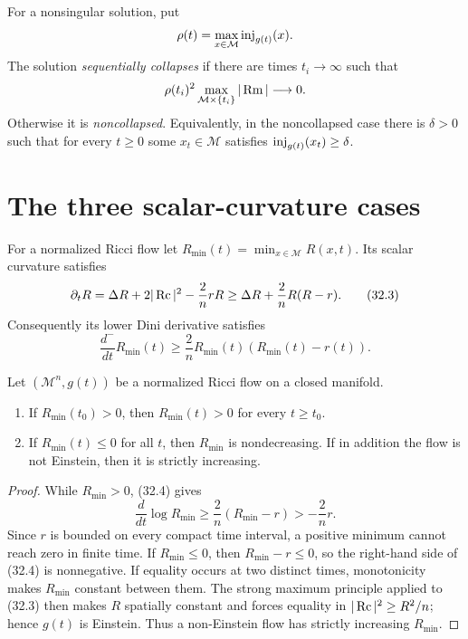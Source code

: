 \begin{definition}
\label{def:chow-iv-sequential-collapse}


For a nonsingular solution, put
\[
 \rho(t)=\max_{x\in\mathcal M}\operatorname{inj}_{g(t)}(x).
\]
The solution \emph{sequentially collapses} if there are times
$t_i\to\infty$ such that
\[
 \rho(t_i)^2\max_{\mathcal M\times\{t_i\}}|\operatorname{Rm}|\longrightarrow0.
\]
Otherwise it is \emph{noncollapsed}.  Equivalently, in the noncollapsed
case there is $\delta>0$ such that for every $t\ge0$ some $x_t\in\mathcal M$
satisfies $\operatorname{inj}_{g(t)}(x_t)\ge\delta$.
\end{definition}

\section{The three scalar-curvature cases}

For a normalized Ricci flow let
$R_{\min}(t)=\min_{x\in\mathcal M}R(x,t)$.  Its scalar curvature satisfies
\begin{equation*}
 \partial_tR=\Delta R+2|\operatorname{Rc}|^2-\frac2n rR
 \ge \Delta R+\frac2nR(R-r).
 \tag{32.3}
\end{equation*}
Consequently its lower Dini derivative satisfies
\begin{equation*}
 \frac{d^-}{dt}R_{\min}(t)
 \ge\frac2nR_{\min}(t)(R_{\min}(t)-r(t)).
 \tag{32.4}
\end{equation*}

\begin{lemma}
\label{lem:chow-iv-minimum-scalar-curvature-monotonicity}

Let $(\mathcal M^n,g(t))$ be a normalized Ricci flow on a closed manifold.
\begin{enumerate}
\item If $R_{\min}(t_0)>0$, then $R_{\min}(t)>0$ for every $t\ge t_0$.
\item If $R_{\min}(t)\le0$ for all $t$, then $R_{\min}$ is nondecreasing.
If in addition the flow is not Einstein, then it is strictly increasing.
\end{enumerate}
\end{lemma}
\begin{proof}
\sketch
While $R_{\min}>0$, (32.4) gives
\[
 \frac d{dt}\log R_{\min}
 \ge \frac2n(R_{\min}-r)>-\frac2n r.
\]
Since $r$ is bounded on every compact time interval, a positive minimum
cannot reach zero in finite time.  If $R_{\min}\le0$, then
$R_{\min}-r\le0$, so the right-hand side of (32.4) is nonnegative.
If equality occurs at two distinct times, monotonicity makes
$R_{\min}$ constant between them.  The strong maximum principle applied to
(32.3) then makes $R$ spatially constant and forces equality in
$|\operatorname{Rc}|^2\ge R^2/n$; hence $g(t)$ is Einstein.  Thus a non-Einstein flow has
strictly increasing $R_{\min}$.
\end{proof}

